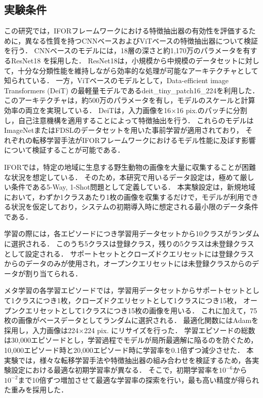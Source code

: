 \documentclass[a4paper,11pt,nomag]{jsreport}
\begin{document}
\subsection{実験条件}

この研究では，IFORフレームワークにおける特徴抽出器の有効性を評価するために，異なる性質を持つCNNベースおよびViTベースの特徴抽出器について検証を行う．
CNNベースのモデルには，18層の深さと約1,170万のパラメータを有するResNet18 \cite{resnet}を採用した．
ResNet18は，小規模から中規模のデータセットに対して，十分な分類性能を維持しながら効率的な処理が可能なアーキテクチャとして知られている．
一方，ViTベースのモデルとして，Data-efficient image Transformers (DeiT) \cite{deit} の最軽量モデルであるdeit\_tiny\_patch16\_224を利用した．
このアーキテクチャは，約500万のパラメータを有し，モデルのスケールと計算効率の両立を実現している．
DeiTは，入力画像を16$\times$16 pix.のパッチに分割し，自己注意機構を適用することによって特徴抽出を行う．
これらのモデルはImageNetまたはFDSLのデータセットを用いた事前学習が適用されており，
それぞれの転移学習手法がIFORフレームワークにおけるモデル性能に及ぼす影響について検証することが可能である．

IFORでは，特定の地域に生息する野生動物の画像を大量に収集することが困難な状況を想定している．
そのため，本研究で用いるデータ設定は，極めて厳しい条件である5-Way, 1-Shot問題として定義している．
本実験設定は，新規地域において，わずか1クラスあたり1枚の画像を収集するだけで，モデルが利用できる状況を仮定しており，システムの初期導入時に想定される最小限のデータ条件である．

学習の際には，各エピソードにつき学習用データセットから10クラスがランダムに選択される．
このうち5クラスは登録クラス，残りの5クラスは未登録クラスとして設定される．
サポートセットとクローズドクエリセットには登録クラスからのデータのみが使用され，オープンクエリセットには未登録クラスからのデータが割り当てられる．

メタ学習の各学習エピソードでは，学習用データセットからサポートセットとして1クラスにつき1枚，クローズドクエリセットとして1クラスにつき15枚，
オープンクエリセットとして1クラスにつき15枚の画像を用いる．
これに加えて，75枚の画像がベースデータとしてランダムに選択される．
最適化関数にはAdamを採用し，入力画像は224$\times$224 pix. にリサイズを行った．
学習エピソードの総数は30,000エピソードとし，学習過程でモデルが局所最適解に陥るのを防ぐため，10,000エピソード時と20,000エピソード時に学習率を0.1倍ずつ減少させた．
本実験では，様々な転移学習手法や特徴抽出器の組み合わせを検証するため，各実験設定における最適な初期学習率が異なる．
そこで，初期学習率を$10^{-6}$から$10^{-2}$まで10倍ずつ増加させて最適な学習率の探索を行い，最も高い精度が得られた重みを採用した．
\end{document}

